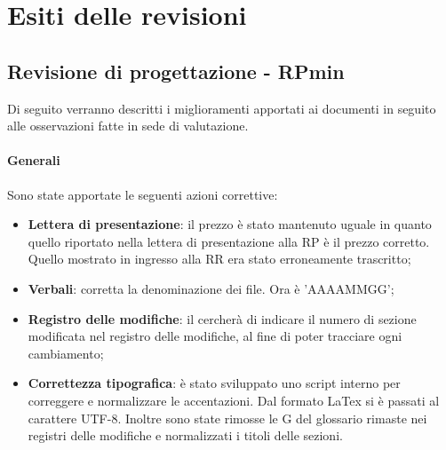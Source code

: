 \section{Esiti delle revisioni}
\subsection{Revisione di progettazione - RPmin}
Di seguito verranno descritti i miglioramenti apportati ai documenti in seguito alle osservazioni fatte in sede di valutazione.
\paragraph*{Generali}
Sono state apportate le seguenti azioni correttive:
\begin{itemize}
\item \textbf{Lettera di presentazione}: il prezzo è stato mantenuto uguale in quanto quello riportato nella lettera di presentazione alla RP è il prezzo corretto. Quello mostrato in ingresso alla RR era stato erroneamente trascritto;
\item \textbf{Verbali}: corretta la denominazione dei file. Ora è 'AAAAMMGG';
\item \textbf{Registro delle modifiche}: il  cercherà di indicare il numero di sezione modificata nel registro delle modifiche, al fine di poter tracciare ogni cambiamento;
\item \textbf{Correttezza tipografica}: è stato sviluppato uno script interno per correggere e normalizzare le accentazioni. Dal formato LaTex si è passati al carattere UTF-8. Inoltre sono state rimosse le G del glossario rimaste nei registri delle modifiche e normalizzati i titoli delle sezioni.
\end{itemize}

